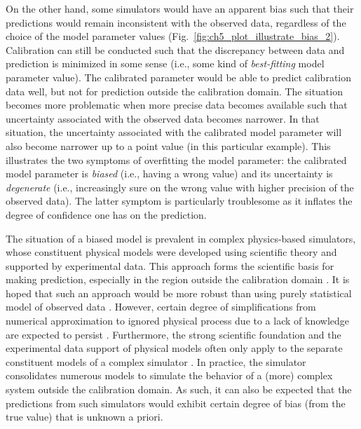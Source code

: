 On the other hand,
some simulators would have an apparent bias such that their predictions would remain inconsistent with the observed data, regardless of the choice of the model parameter values (Fig.~\ref{fig:ch5_plot_illustrate_bias_2}).
Calibration can still be conducted such that the discrepancy between data and prediction is minimized in some sense (i.e., some kind of \emph{best-fitting} model parameter value).
The calibrated parameter would be able to predict calibration data well, but not for prediction outside the calibration domain.
The situation becomes more problematic when more precise data becomes available such that uncertainty associated with the observed data becomes narrower.
In that situation, the uncertainty associated with the calibrated model parameter will also become narrower up to a point value (in this particular example).
This illustrates the two symptoms of overfitting the model parameter: the calibrated model parameter is \emph{biased} (i.e., having a wrong value) and its uncertainty is \emph{degenerate} (i.e., increasingly sure on the wrong value with higher precision of the observed data).
The latter symptom is particularly troublesome as it inflates the degree of confidence one has on the prediction.

The situation of a biased model is prevalent in complex physics-based simulators, whose constituent physical models were developed using scientific theory and supported by experimental data.
This approach forms the scientific basis for making prediction, especially in the region outside the calibration domain \cite{Arhonditsis2008}.
It is hoped that such an approach would be more robust than using purely statistical model of observed data \cite{Bayarri2007,Reichert2012}.
However, certain degree of simplifications from numerical approximation to ignored physical process due to a lack of knowledge are expected to persist \cite{Beven2009}.
Furthermore, the strong scientific foundation and the experimental data support of physical models often only apply to the separate constituent models of a complex simulator \cite{Campbell2006}.
In practice, the simulator consolidates numerous models to simulate the behavior of a (more) complex system outside the calibration domain.
As such, it can also be expected that the predictions from such simulators would exhibit certain degree of bias (from the true value) that is unknown a priori.

